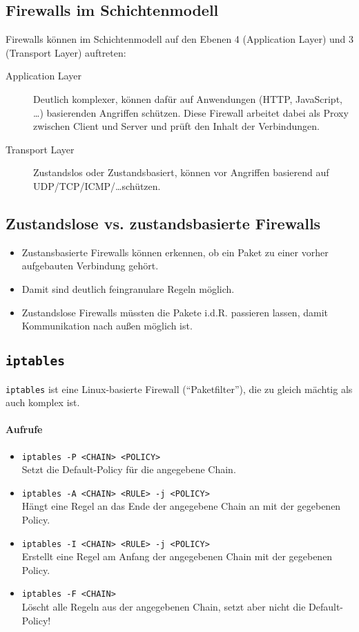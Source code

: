         \subsection{Firewalls im Schichtenmodell}
	        Firewalls können im Schichtenmodell auf den Ebenen 4 (Application Layer) und 3 (Transport Layer) auftreten:
	        \begin{description}
	        	\item[Application Layer] Deutlich komplexer, können dafür auf Anwendungen (HTTP, JavaScript, \dots) basierenden Angriffen schützen. Diese Firewall arbeitet dabei als Proxy zwischen Client und Server und prüft den Inhalt der Verbindungen.
	        	\item[Transport Layer] Zustandslos oder Zustandsbasiert, können vor Angriffen basierend auf UDP/TCP/ICMP/\dots schützen.
	        \end{description}
    
        \subsection{Zustandslose vs. zustandsbasierte Firewalls}
	        \begin{itemize}
	        	\item Zustansbasierte Firewalls können erkennen, ob ein Paket zu einer vorher aufgebauten Verbindung gehört.
	        	\item Damit sind deutlich feingranulare Regeln möglich.
	        	\item Zustandslose Firewalls müssten die Pakete i.d.R. passieren lassen, damit Kommunikation nach außen möglich ist.
	        \end{itemize}
        
	    \subsection{\texttt{iptables}}
		    \texttt{iptables} ist eine Linux-basierte Firewall (\enquote{Paketfilter}), die zu gleich mächtig als auch komplex ist.
		    
		    \paragraph{Aufrufe}
			    \begin{itemize}
			    	\item \texttt{iptables -P <CHAIN> <POLICY>} \\ Setzt die Default-Policy für die angegebene Chain.
			    	\item \texttt{iptables -A <CHAIN> <RULE> -j <POLICY>} \\ Hängt eine Regel an das Ende der angegebene Chain an mit der gegebenen Policy.
			    	\item \texttt{iptables -I <CHAIN> <RULE> -j <POLICY>} \\ Erstellt eine Regel am Anfang der angegebenen Chain mit der gegebenen Policy.
			    	\item \texttt{iptables -F <CHAIN>} \\ Löscht alle Regeln aus der angegebenen Chain, setzt aber nicht die Default-Policy!
			    \end{itemize}
		    
